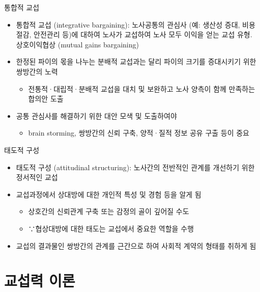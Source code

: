 \documentclass[aspectratio=169,xcolor=dvipsnames,handout]{beamer}
\begin{document}
\begin{frame}{통합적 교섭}
    \begin{itemize}[<+->]
        \item 통합적 교섭 (integrative bargaining): 노사공통의 관심사 (예: 생산성 증대, 비용절감, 안전관리 등)에 대하여 노사가 교섭하여 노사 모두 이익을 얻는 교섭 유형. 상호이익협상 (mutual gains bargaining)
        \item 한정된 파이의 몫을 나누는 분배적 교섭과는 달리 파이의 크기를 증대시키기 위한 쌍방간의 노력
        \begin{itemize}[<+->]
            \item 전통적·대립적·분배적 교섭을 대치 및 보완하고 노사 양측이 함께 만족하는 합의안 도출
        \end{itemize}
    \item 공통 관심사를 해결하기 위한 대안 모색 및 도출하여야
        \begin{itemize}[<+->]
            \item brain storming, 쌍방간의 신뢰 구축, 양적·질적 정보 공유 구출 등이 중요
        \end{itemize}
    \end{itemize}
\end{frame}

\begin{frame}{태도적 구성}
    \begin{itemize}[<+->]
        \item 태도적 구성 (attitudinal structuring): 노사간의 전반적인 관계를 개선하기 위한 정서적인 교섭
        \item 교섭과정에서 상대방에 대한 개인적 특성 및 경험 등을 알게 됨
        \begin{itemize}[<+->]
            \item 상호간의 신뢰관계 구축 또는 감정의 골이 깊어질 수도 
            \item ∵협상대방에 대한 태도는 교섭에서 중요한 역할을 수행
        \end{itemize}
    \item 교섭의 결과물인 쌍방간의 관계를 근간으로 하여 사회적 계약의 형태를 취하게 됨 
    \end{itemize}
\end{frame}

\section{교섭력 이론}
\end{document}
